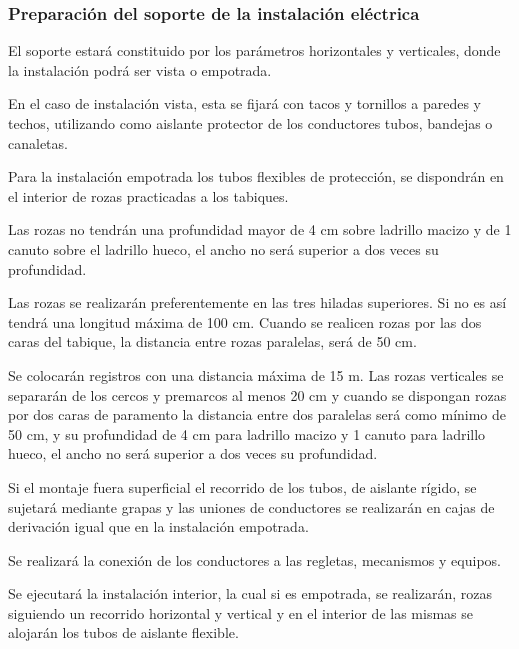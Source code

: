 \documentclass[../main.tex]{subfiles}
\begin{document}
\subsubsection{Preparación del soporte de la instalación eléctrica}
El soporte estará constituido por los parámetros horizontales y verticales, donde la instalación podrá ser vista o empotrada. \par
\vspace{0.5 cm}
En el caso de instalación vista, esta se fijará con tacos y tornillos a paredes y techos, utilizando como aislante protector de los conductores tubos, bandejas o canaletas. \par
\vspace{0.5 cm}
Para la instalación empotrada los tubos flexibles de protección, se dispondrán en el interior de rozas practicadas a los tabiques. \par
\vspace{0.5 cm}
Las rozas no tendrán una profundidad mayor de 4 cm sobre ladrillo macizo y de 1 canuto sobre el ladrillo hueco, el ancho no será superior a dos veces su profundidad. \par
\vspace{0.5 cm}
Las rozas se realizarán preferentemente en las tres hiladas superiores. Si no es así tendrá una longitud máxima de 100 cm.
Cuando se realicen rozas por las dos caras del tabique, la distancia entre rozas paralelas, será de 50 cm. \par
\vspace{0.5 cm}
Se colocarán registros con una distancia máxima de 15 m. Las rozas verticales se separarán de los cercos y premarcos al menos 20 cm y cuando se dispongan rozas por dos caras de paramento la distancia entre dos paralelas será como mínimo de 50 cm, y su profundidad de 4 cm para ladrillo macizo y 1 canuto para ladrillo hueco, el ancho no será superior a dos veces su profundidad. \par
Si el montaje fuera superficial el recorrido de los tubos, de aislante rígido, se sujetará mediante grapas y las uniones de
conductores se realizarán en cajas de derivación igual que en la instalación empotrada. \par
\vspace{0.5 cm}
Se realizará la conexión de los conductores a las regletas, mecanismos y equipos. \par
\vspace{0.5 cm}
Se ejecutará la instalación interior, la cual si es empotrada, se realizarán, rozas siguiendo un recorrido horizontal y vertical y en el interior de las mismas se alojarán los tubos de aislante flexible.
\end{document}
